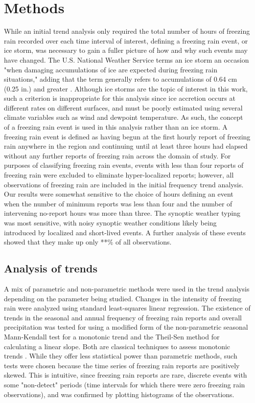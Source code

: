 \documentclass[twocol]{ametsoc}
\begin{document}
\section{Methods}
While an initial trend analysis only required the total number of hours of freezing rain recorded over each time interval of interest, defining a freezing rain event, or ice storm, was necessary to gain a fuller picture of how and why such events may have changed. The U.S. National Weather Service terms an ice storm an occasion "when damaging accumulations of ice are expected during freezing rain situations," adding that the term generally refers to accumulations of 0.64 cm (0.25 in.) and greater \citep{nwsglossary}. Although ice storms are the topic of interest in this work, such a criterion is inappropriate for this analysis since ice accretion occurs at different rates on different surfaces, and must be poorly estimated using several climate variables such as wind and dewpoint temperature. As such, the concept of a freezing rain event is used in this analysis rather than an ice storm. A freezing rain event is defined as having begun at the first hourly report of freezing rain anywhere in the region and continuing until at least three hours had elapsed without any further reports of freezing rain across the domain of study. For purposes of classifying freezing rain events, events with less than four reports of freezing rain were excluded to eliminate hyper-localized reports; however, all observations of freezing rain are included in the initial frequency trend analysis. Our results were somewhat sensitive to the choice of hours defining an event when the number of minimum reports was less than four and the number of intervening no-report hours was more than three. The synoptic weather typing was most sensitive, with noisy synoptic weather conditions likely being introduced by localized and short-lived events. A further analysis of these events showed that they make up only **\% of all observations.

\subsection{Analysis of trends}
A mix of parametric and non-parametric methods were used in the trend analysis depending on the parameter being studied. Changes in the intensity of freezing rain were analyzed using standard least-squares linear regression. The existence of trends in the seasonal and annual frequency of freezing rain reports and overall precipitation was tested for using a modified form of the non-parametric seasonal Mann-Kendall test for a monotonic trend and the Theil-Sen method for calculating a linear slope. Both are classical techniques to assess monotonic trends \citep{chandler2011statistical}. While they offer less statistical power than parametric methods, such tests were chosen because the time series of freezing rain reports are positively skewed. This is intuitive, since freezing rain reports are rare, discrete events with some "non-detect" periods (time intervals for which there were zero freezing rain observations), and was confirmed by plotting histograms of the observations.
\end{document}
